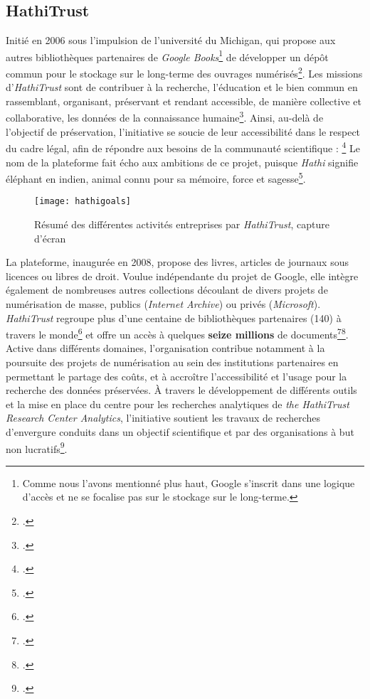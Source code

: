 \subsection{HathiTrust}

Initié en 2006 sous l'impulsion de l'université du Michigan, qui propose aux autres bibliothèques partenaires de \textit{Google Books}\footnote{Comme nous l'avons mentionné plus haut, Google s'inscrit dans une logique d'accès et ne se focalise pas sur le stockage sur le long-terme.} de développer un dépôt commun pour le stockage sur le long-terme des ouvrages numérisés\footcite{noauthor_viewpoint_nodate}. Les missions d'\textit{HathiTrust} sont de contribuer à la recherche, l'éducation et le bien commun en rassemblant, organisant, préservant et rendant accessible, de manière collective et collaborative, les données de la connaissance humaine\footcite{hathitrust_digital_library_charting_nodate}. Ainsi, au-delà de l'objectif de préservation, l'initiative se soucie de leur accessibilité dans le respect du cadre légal, afin de répondre aux besoins de la communauté scientifique : \footcite[p.275]{xie_discover_2016} Le nom de la plateforme fait écho aux ambitions de ce projet, puisque \textit{Hathi} signifie éléphant en indien, animal connu pour sa mémoire, force et sagesse\footcite{xie_discover_2016}.

\begin{figure}[H]%
\centering
\texttt{[image: hathigoals]}
\caption{Résumé des différentes activités entreprises par \textit{HathiTrust}, capture d'écran}
\end{figure}

La plateforme, inaugurée en 2008, propose des livres, articles de journaux sous licences ou libres de droit. Voulue indépendante du projet de Google, elle intègre également de nombreuses autres collections découlant de divers projets de numérisation de masse, publics (\textit{Internet Archive}) ou privés (\textit{Microsoft}). \textit{HathiTrust} regroupe plus d'une centaine de bibliothèques partenaires (140) à travers le monde\footcite{obrien_large-scale_2015} et offre un accès à quelques \textbf{seize millions} de documents\footcite{xie_discover_2016}\footcite{hathitrust_digital_library_charting_nodate}. Active dans différents domaines, l'organisation contribue notamment à la poursuite des projets de numérisation au sein des institutions partenaires en permettant le partage des coûts, et à accroître l'accessibilité et l'usage pour la recherche des données préservées. À travers le développement de différents outils et la mise en place du centre pour les recherches analytiques de \textit{the HathiTrust Research Center Analytics}, l'initiative soutient les travaux de recherches d'envergure conduits dans un objectif scientifique et par des organisations à but non lucratifs\footcite{hathitrust_digital_library_htrc_nodate}.

